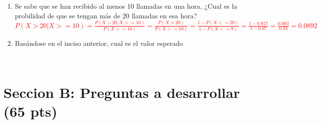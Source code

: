 \documentclass[addpoints]{exam}
\theoremstyle{mytheor}
\begin{document}
\begin{questions}
\begin{enumerate}
  \item Se sabe que se han recibido al menos 10 llamadas en una hora, ¿Cual es la probilidad de que se tengan más de 20 llamadas en esa hora? \\
  \textcolor{red}{$P(X>20|X>=10) = \frac{P(X>20, X>=10)}{P(X>=10)} = \frac{P(X>20)}{P(X>=10)} = \frac{1 - P(X<=20)}{1-P(X<=9)} = \frac{1-0.917}{1-0.07} = \frac{0.083}{0.93} = 0.0892$}

  \item Basándose en el inciso anterior, cual es el valor esperado 

  \end{enumerate}
  
  
  
  
  
  \
  
\end{questions}
  
  \section*{Seccion B: Preguntas a desarrollar (65 pts)}
  
\end{document}
